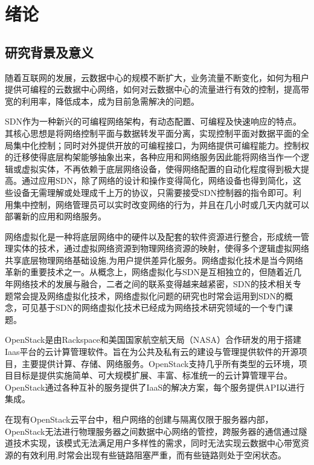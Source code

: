 
\chapter{绪论}
\section{研究背景及意义}
随着互联网的发展，云数据中心的规模不断扩大，业务流量不断变化，如何为租户提供可编程的云数据中心网络，如何对云数据中心的流量进行有效的控制，提高带宽的利用率，降低成本，成为目前急需解决的问题。

\gls*{SDN}作为一种新兴的可编程网络架构，有动态配置、可编程及快速响应的特点。其核心思想是将网络控制平面与数据转发平面分离，实现控制平面对数据平面的全局集中化控制；同时对外提供开放的可编程接口，为网络提供可编程能力。控制权的迁移使得底层构架能够抽象出来，各种应用和网络服务因此能将网络当作一个逻辑或虚拟实体，不再依赖于底层网络设备\cite{SDN-1}，使得网络配置的自动化程度得到极大提高。通过应用SDN，除了网络的设计和操作变得简化，网络设备也得到简化，这些设备无需理解或处理成千上万的协议，只需要接受SDN控制器的指令即可。利用集中控制，网络管理员可以实时改变网络的行为，并且在几小时或几天内就可以部署新的应用和网络服务。

网络虚拟化\cite{Virtual-1}是一种将底层网络中的硬件以及配套的软件资源进行整合，形成统一管理实体的技术，通过虚拟网络资源到物理网络资源的映射，使得多个逻辑虚拟网络共享底层物理网络基础设施,为用户提供差异化服务。网络虚拟化技术是当今网络革新的重要技术之一。从概念上，网络虚拟化与SDN是互相独立的，但随着近几年网络技术的发展与融合，二者之间的联系变得越来越紧密，SDN的技术相关专题常会提及网络虚拟化技术，网络虚拟化问题的研究也时常会运用到SDN的概念，可见基于SDN的网络虚拟化技术已经成为网络技术研究领域的一个专门课题。

OpenStack\cite{Openstack-1}是由Rackspace和美国国家航空航天局（NASA）合作研发的用于搭建Iaas平台的云计算管理软件。旨在为公共及私有云的建设与管理提供软件的开源项目，主要提供计算、存储、网络服务。OpenStack支持几乎所有类型的云环境，项目目标是提供实施简单、可大规模扩展、丰富、标准统一的云计算管理平台。OpenStack通过各种互补的服务提供了\gls*{IaaS}的解决方案，每个服务提供API以进行集成\cite{Openstack-2}。

在现有OpenStack云平台中，租户网络的创建与隔离仅限于服务器内部，OpenStack无法进行物理服务器之间数据中心网络的管控，跨服务器的通信通过隧道技术实现，该模式无法满足用户多样性的需求，同时无法实现云数据中心带宽资源的有效利用,时常会出现有些链路阻塞严重，而有些链路则处于空闲状态。

